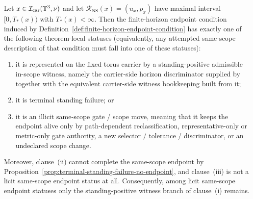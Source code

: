 \begin{manualtheorem}
\label{thm:same-scope-continuation-failure-dichotomy}
Let $x\in\mathcal I_{\mathrm{car}}(\mathbb{T}^3,\nu)$ and let $\mathcal R_{\mathrm{NS}}(x)=(u_x,p_x)$ have maximal interval $[0,T_*(x))$ with $T_*(x)<\infty$. Then the finite-horizon endpoint condition induced by Definition~\ref{def:finite-horizon-endpoint-condition} has exactly one of the following theorem-local statuses (equivalently, any attempted same-scope description of that condition must fall into one of these statuses):
\begin{enumerate}[label=(\roman*), leftmargin=2.2em]
\item it is represented on the fixed torus carrier by a standing-positive admissible in-scope witness, namely the carrier-side horizon discriminator supplied by \HorizonDetectabilityRef{} together with the equivalent carrier-side witness bookkeeping built from it;
\item it is terminal standing failure; or
\item it is an illicit same-scope gate / scope move, meaning that it keeps the endpoint alive only by path-dependent reclassification, representative-only or metric-only gate authority, a new selector / tolerance / discriminator, or an undeclared scope change.
\end{enumerate}
Moreover, clause~(ii) cannot complete the same-scope endpoint by Proposition~\ref{prop:terminal-standing-failure-no-endpoint}, and clause~(iii) is not a licit same-scope endpoint status at all. Consequently, among licit same-scope endpoint statuses only the standing-positive witness branch of clause~(i) remains.
\end{manualtheorem}

